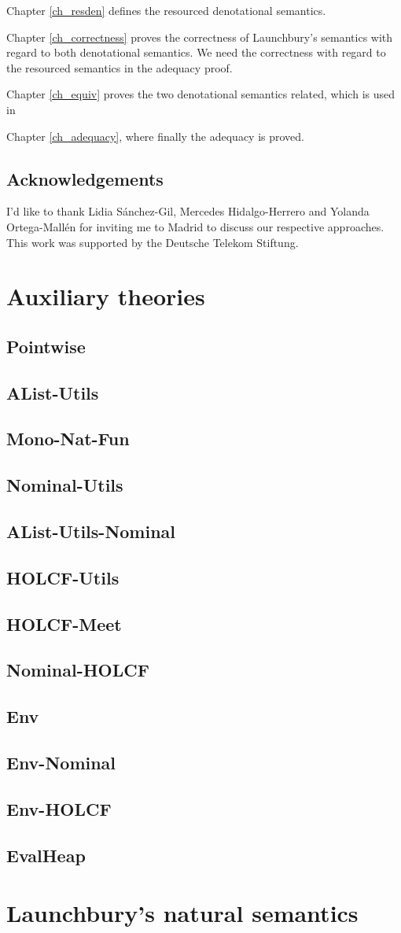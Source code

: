 \documentclass[11pt,a4paper,parskip=half]{scrartcl}
\begin{document}
Chapter \ref{ch_resden} defines the resourced denotational semantics.

Chapter \ref{ch_correctness} proves the correctness of Launchbury's semantics with regard to both denotational semantics. We need the correctness with regard to the resourced semantics in the adequacy proof.

Chapter \ref{ch_equiv} proves the two denotational semantics related, which is used in

Chapter \ref{ch_adequacy}, where finally the adequacy is proved.

%
%

\subsection{Acknowledgements}

I'd like to thank Lidia Sánchez-Gil, Mercedes Hidalgo-Herrero and Yolanda Ortega-Mallén for inviting me to Madrid to discuss our respective approaches.\\
This work was supported by the Deutsche Telekom Stiftung.

\clearpage
\newcommand{\theory}[1]{\subsection{#1}\label{sec_#1}}

\section{Auxiliary theories}
\label{ch_aux}

\theory{Pointwise}
\theory{AList-Utils}
\theory{Mono-Nat-Fun}

\theory{Nominal-Utils}
\theory{AList-Utils-Nominal}

\theory{HOLCF-Utils}
\theory{HOLCF-Meet}
\theory{Nominal-HOLCF}


\theory{Env}
\theory{Env-Nominal}
\theory{Env-HOLCF}
\theory{EvalHeap}


\clearpage
\section{Launchbury's natural semantics}
\label{ch_natsem}
\end{document}
